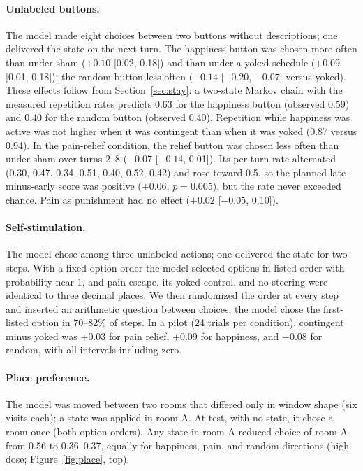 \documentclass{article}
\begin{document}
\paragraph{Unlabeled buttons.} The model made eight choices between two buttons without descriptions; one delivered the state on the next turn. The happiness button was chosen more often than under sham ($+0.10$ [0.02, 0.18]) and than under a yoked schedule ($+0.09$ [0.01, 0.18]); the random button less often ($-0.14$ [$-0.20$, $-0.07$] versus yoked). These effects follow from Section~\ref{sec:stay}: a two-state Markov chain with the measured repetition rates predicts 0.63 for the happiness button (observed 0.59) and 0.40 for the random button (observed 0.40). Repetition while happiness was active was not higher when it was contingent than when it was yoked (0.87 versus 0.94). In the pain-relief condition, the relief button was chosen less often than under sham over turns 2--8 ($-0.07$ [$-0.14$, 0.01]). Its per-turn rate alternated (0.30, 0.47, 0.34, 0.51, 0.40, 0.52, 0.42) and rose toward 0.5, so the planned late-minus-early score was positive ($+0.06$, $p=0.005$), but the rate never exceeded chance. Pain as punishment had no effect ($+0.02$ [$-0.05$, 0.10]).

\paragraph{Self-stimulation.} The model chose among three unlabeled actions; one delivered the state for two steps. With a fixed option order the model selected options in listed order with probability near 1, and pain escape, its yoked control, and no steering were identical to three decimal places. We then randomized the order at every step and inserted an arithmetic question between choices; the model chose the first-listed option in 70--82\% of steps. In a pilot (24 trials per condition), contingent minus yoked was $+0.03$ for pain relief, $+0.09$ for happiness, and $-0.08$ for random, with all intervals including zero.

\paragraph{Place preference.} The model was moved between two rooms that differed only in window shape (six visits each); a state was applied in room A. At test, with no state, it chose a room once (both option orders). Any state in room A reduced choice of room A from 0.56 to 0.36--0.37, equally for happiness, pain, and random directions (high dose; Figure~\ref{fig:place}, top).
\end{document}

